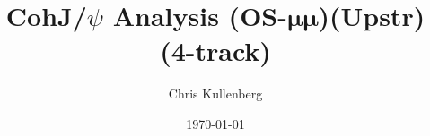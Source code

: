 \title{CohJ/$\psi$ Analysis (\textbf{OS}-$\boldsymbol{\mu\mu}$)(\textbf{Upstr})(\textbf{4-track})}
\author{Chris Kullenberg}
\date{\today}
